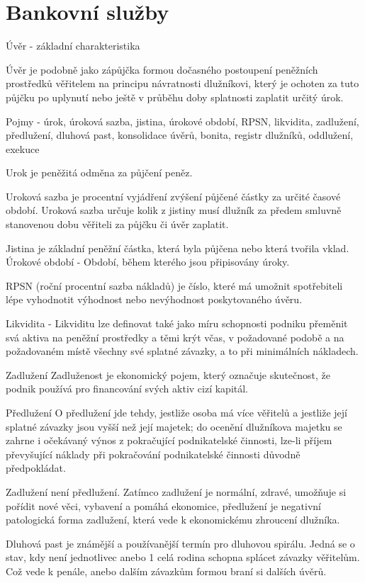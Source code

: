 \chapter{Bankovní služby}

Úvěr - základní charakteristika

Úvěr je podobně jako zápůjčka formou dočasného postoupení peněžních prostředků věřitelem
na principu návratnosti dlužníkovi, který je ochoten za tuto půjčku po uplynutí nebo ještě v
průběhu doby splatnosti zaplatit určitý úrok.

Pojmy - úrok, úroková sazba, jistina, úrokové období, RPSN, likvidita, zadlužení,
předlužení, dluhová past, konsolidace úvěrů, bonita, registr dlužníků, oddlužení,
exekuce

Urok je peněžitá odměna za půjčení peněz.

Uroková sazba je procentní vyjádření zvýšení půjčené částky za určité časové období.
Uroková sazba určuje kolik z jistiny musí dlužník za předem smluvně stanovenou dobu
věřiteli za půjčku či úvěr zaplatit.

Jistina je základní peněžní částka, která byla půjčena nebo která tvořila vklad.
Úrokové období - Období, během kterého jsou připisovány úroky.

RPSN (roční procentní sazba nákladů) je číslo, které má umožnit spotřebiteli lépe vyhodnotit
výhodnost nebo nevýhodnost poskytovaného úvěru.

Likvidita - Likviditu lze definovat také jako míru schopnosti podniku přeměnit svá aktiva na
peněžní prostředky a těmi krýt včas, v požadované podobě a na požadovaném místě všechny
své splatné závazky, a to při minimálních nákladech.

Zadlužení Zadluženost je ekonomický pojem, který označuje skutečnost, že podnik používá
pro financování svých aktiv cizí kapitál.

Předlužení O předlužení jde tehdy, jestliže osoba má více věřitelů a jestliže její splatné
závazky jsou vyšší než její majetek; do ocenění dlužníkova majetku se zahrne i očekávaný
výnos z pokračující podnikatelské činnosti, lze-li příjem převyšující náklady při pokračování
podnikatelské činnosti důvodně předpokládat.

Zadlužení není předlužení. Zatímco zadlužení je normální, zdravé, umožňuje si pořídit nové
věci, vybavení a pomáhá ekonomice, předlužení je negativní patologická forma zadlužení,
která vede k ekonomickému zhroucení dlužníka.

Dluhová past je známější a používanější termín pro dluhovou spirálu. Jedná se o stav, kdy
není jednotlivec anebo 1 celá rodina schopna splácet závazky věřitelům. Což vede k penále,
anebo dalším závazkům formou braní si dalších úvěrů.

